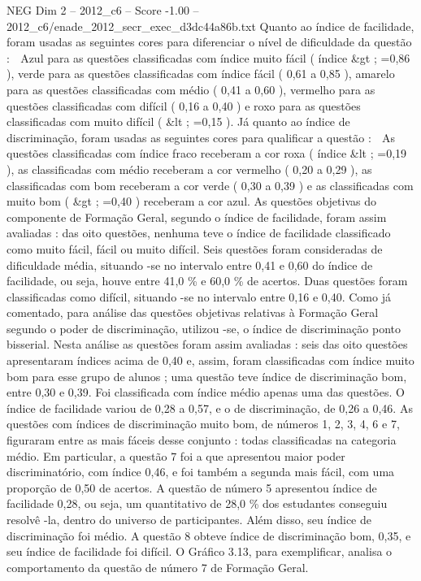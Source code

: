 \begin{textsample}{NEG Dim 2 – 2012\_c6 – Score -1.00 – 2012\_c6/enade\_2012\_secr\_exec\_d3dc44a86b.txt}
Quanto ao índice de facilidade, foram usadas as seguintes cores para diferenciar o nível de dificuldade da questão :  Azul para as questões classificadas com índice muito fácil ( índice \&gt ; =0,86 ), verde para as questões classificadas com índice fácil ( 0,61 a 0,85 ), amarelo para as questões classificadas com médio ( 0,41 a 0,60 ), vermelho para as questões classificadas com difícil ( 0,16 a 0,40 ) e roxo para as questões classificadas com muito difícil ( \&lt ; =0,15 ).
Já quanto ao índice de discriminação, foram usadas as seguintes cores para qualificar a questão :  As questões classificadas com índice fraco receberam a cor roxa ( índice \&lt ; =0,19 ), as classificadas com médio receberam a cor vermelho ( 0,20 a 0,29 ), as classificadas com bom receberam a cor verde ( 0,30 a 0,39 ) e as classificadas com muito bom ( \&gt ; =0,40 ) receberam a cor azul.
As questões objetivas do componente de Formação Geral, segundo o índice de facilidade, foram assim avaliadas : das oito questões, nenhuma teve o índice de facilidade classificado como muito fácil, fácil ou muito difícil.
Seis questões foram consideradas de dificuldade média, situando -se no intervalo entre 0,41 e 0,60 do índice de facilidade, ou seja, houve entre 41,0 \% e 60,0 \% de acertos.
Duas questões foram classificadas como difícil, situando -se no intervalo entre 0,16 e 0,40.
Como já comentado, para análise das questões objetivas relativas à Formação Geral segundo o poder de discriminação, utilizou -se, o índice de discriminação ponto bisserial.
Nesta análise as questões foram assim avaliadas : seis das oito questões apresentaram índices acima de 0,40 e, assim, foram classificadas com índice muito bom para esse grupo de alunos ; uma questão teve índice de discriminação bom, entre 0,30 e 0,39.
Foi classificada com índice médio apenas uma das questões.
O índice de facilidade variou de 0,28 a 0,57, e o de discriminação, de 0,26 a 0,46.
As questões com índices de discriminação muito bom, de números 1, 2, 3, 4, 6 e 7, figuraram entre as mais fáceis desse conjunto : todas classificadas na categoria médio.
Em particular, a questão 7 foi a que apresentou maior poder discriminatório, com índice 0,46, e foi também a segunda mais fácil, com uma proporção de 0,50 de acertos.
A questão de número 5 apresentou índice de facilidade 0,28, ou seja, um quantitativo de 28,0 \% dos estudantes conseguiu resolvê -la, dentro do universo de participantes.
Além disso, seu índice de discriminação foi médio.
A questão 8 obteve índice de discriminação bom, 0,35, e seu índice de facilidade foi difícil.
O Gráfico 3.13, para exemplificar, analisa o comportamento da questão de número 7 de Formação Geral.

\end{textsample}
